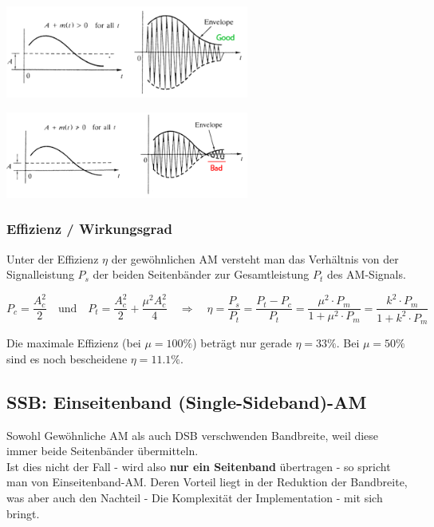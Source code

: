 \begin{minipage}[t][2.3cm][c]{9.5cm}
	\begin{center}
      \includegraphics[width=8cm]{bilder/am_oam_enveloppeGood.png}
	\end{center}
\end{minipage}
\begin{minipage}[t][2.3cm][c]{9.5cm}
    \begin{center}
    	\includegraphics[width=8cm]{bilder/am_oam_enveloppeBad.png}
	\end{center}
\end{minipage}

\subsubsection{Effizienz / Wirkungsgrad}
Unter der Effizienz $ \eta $ der gewöhnlichen AM versteht man das Verhältnis von der Signalleistung
$P_s$ der beiden Seitenbänder zur Gesamtleistung $P_t$ des AM-Signals.

$$ P_c = \frac{A_c^2}{2} \quad \text{und} \quad P_t = \frac{A_c^2}{2} + \frac{\mu^2 A_c^2}{4}
\quad \Longrightarrow \quad \eta = \frac{P_s}{P_t} = \frac{P_t - P_c}{P_t} =
\frac{\mu^2\cdot P_m}{1+\mu^2 \cdot P_m} =
\frac{k^2\cdot P_m}{1+k^2 \cdot P_m}$$

Die maximale Effizienz (bei $\mu = 100\% $) beträgt nur gerade $ \eta = 33\% $. Bei $\mu = 50\% $
sind es noch bescheidene $\eta = 11.1\% $.

\subsection{SSB: Einseitenband (Single-Sideband)-AM}
Sowohl Gewöhnliche AM als auch DSB verschwenden Bandbreite, weil diese immer beide Seitenbänder
übermitteln. \\
Ist dies nicht der Fall - wird also \textbf{nur ein Seitenband} übertragen - so spricht man von
Einseitenband-AM. Deren Vorteil liegt in der Reduktion der Bandbreite, was aber auch den Nachteil
- Die Komplexität der Implementation - mit sich bringt.

